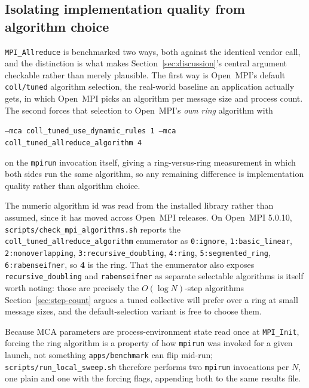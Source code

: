 \subsection{Isolating implementation quality from algorithm choice}
\label{sec:mca-forcing}

\texttt{MPI\_Allreduce} is benchmarked two ways, both against the identical vendor call, and the distinction is what makes Section~\ref{sec:discussion}'s central argument checkable rather than merely plausible. The first way is Open~MPI's default \texttt{coll/tuned} algorithm selection, the real-world baseline an application actually gets, in which Open~MPI picks an algorithm per message size and process count. The second forces that selection to Open~MPI's \emph{own ring} algorithm with
\begin{center}
\texttt{--mca coll\_tuned\_use\_dynamic\_rules 1 --mca coll\_tuned\_allreduce\_algorithm 4}
\end{center}
on the \texttt{mpirun} invocation itself, giving a ring-versus-ring measurement in which both sides run the same algorithm, so any remaining difference is implementation quality rather than algorithm choice.

The numeric algorithm id was read from the installed library rather than assumed, since it has moved across Open~MPI releases. On Open~MPI 5.0.10, \texttt{scripts/check\_mpi\_algorithms.sh} reports the \texttt{coll\_tuned\_allreduce\_algorithm} enumerator as \texttt{0:ignore}, \texttt{1:basic\_linear}, \texttt{2:nonoverlapping}, \texttt{3:recursive\_doubling}, \texttt{4:ring}, \texttt{5:segmented\_ring}, \texttt{6:rabenseifner}, so \textbf{4} is the ring. That the enumerator also exposes \texttt{recursive\_doubling} and \texttt{rabenseifner} as separate selectable algorithms is itself worth noting: those are precisely the $O(\log N)$-step algorithms Section~\ref{sec:step-count} argues a tuned collective will prefer over a ring at small message sizes, and the default-selection variant is free to choose them.

Because MCA parameters are process-environment state read once at \texttt{MPI\_Init}, forcing the ring algorithm is a property of how \texttt{mpirun} was invoked for a given launch, not something \texttt{apps/benchmark} can flip mid-run; \texttt{scripts/run\_local\_sweep.sh} therefore performs two \texttt{mpirun} invocations per $N$, one plain and one with the forcing flags, appending both to the same results file.
